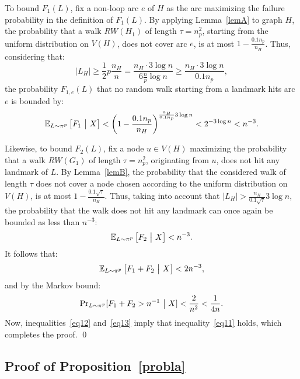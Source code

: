 \documentclass[11pt,a4paper]{article}
\newcommand{\E}{\ensuremath \mathbb E}
\renewcommand{\Pr}{\ensuremath \mathrm {Pr}}
\renewcommand{\*}{\hspace*{5mm}}
\begin{document}
To bound $F_1(L)$, fix a non-loop arc $e$ of $H$ as the arc maximizing the failure probability in the definition of $F_1(L)$. By applying Lemma~\ref{lemA} to graph $H$, the probability that a walk $RW(H_1)$ of length $\tau=n_p^2$, starting from the uniform distribution on $V(H)$, does not cover arc $e$, is at most $1 - \frac{0.1 n_p}{n_H}$. Thus, considering that:
$$
|L_H| \geq \frac{1}{2} p \frac{n_H}{n} = \frac{n_H \cdot 3 \log n}{6 \frac n p\log n} \geq \frac{n_H \cdot 3 \log n}{0.1 n_p},
$$
the probability $F_{1,e}(L)$ that no random walk starting from a landmark hits arc $e$ is bounded by:
$$
\E_{L\sim \pi^p} \left[F_{1} \ \big|\ X \right] < \left(   1 - \frac{0.1 n_p}{n_H}  \right)^{\frac{n_H}{0.1 n_p} 3 \log n} < 2^{-3 \log n} < n^{-3}.
$$

Likewise, to bound $F_2(L)$, fix a node $u \in V(H)$ maximizing the probability that a walk $RW(G_1)$ of length $\tau = n_p^2$, originating from $u$, does not hit any landmark of $L$. By Lemma~\ref{lemB}, the probability that the considered walk of length $\tau$ does not cover a node chosen according to the uniform distribution on $V(H)$, is at most $1 - \frac{0.1 \sqrt{\tau}}{n_H}$. Thus, taking into account that $|L_H| > \frac{n_H}{0.1 \sqrt{\tau}} 3 \log n$, the probability that the walk does not hit any landmark can once again be bounded as less than $n^{-3}$:
$$
\E_{L\sim \pi^p} \left[F_2\ \big|\ X \right] < n^{-3}.
$$
It follows that:
$$
\E_{L\sim \pi^p} \left[F_1 + F_2\ \big|\ X \right] < 2n^{-3},
$$
and by the Markov bound:
\begin{equation}\label{eq13}
\Pr_{L\sim \pi^p} [F_1 + F_2> n^{-1}\  \big|\ X  ] < \frac{2}{n^2} < \frac{1}{4n}.
\end{equation}
Now, inequalities~\eqref{eq12} and~\eqref{eq13} imply that inequality~\eqref{eq11} holds, which completes the proof.
\qed

\subsection*{Proof of Proposition~\ref{probla}}
\end{document}

